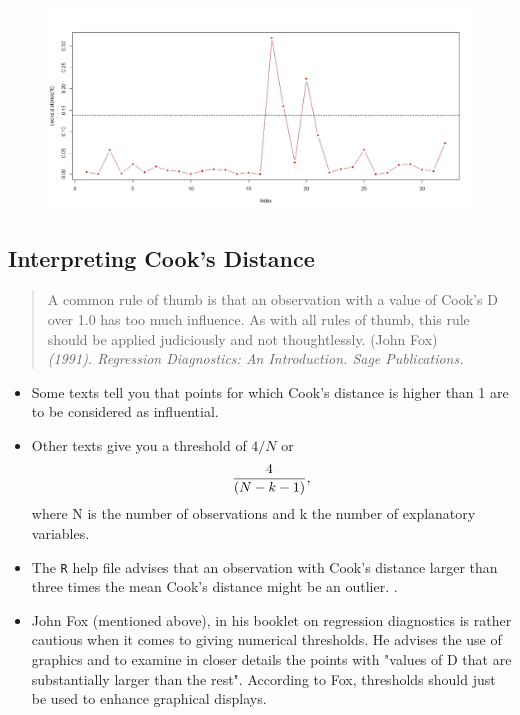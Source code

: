 \documentclass[residuals.tex]{subfiles}
\begin{document}
\begin{figure}[h!]
\centering
\includegraphics[width=0.9\linewidth]{cooksplot}
\caption{}
\label{fig:cooksplot}
\end{figure}


\newpage


\subsection{Interpreting Cook's Distance}
\begin{quote}
A common rule of thumb is that an observation with a value of Cook's D over 1.0 has too much influence. As with all rules of thumb, this rule should be applied judiciously and not thoughtlessly. (John Fox)\\ \textit{(1991). Regression Diagnostics: An Introduction. Sage Publications.}
\end{quote}
\bigskip
\begin{itemize}
\item Some texts tell you that points for which Cook's distance is higher than 1 are to be considered as influential. 
\item Other texts give you a threshold of $4/N$ or \[ {4  \over (N-k-1)} ,\] where N is the number of observations and k the number of explanatory variables. 
\item The \texttt{R} help file advises that an observation with Cook's distance larger than three times the mean Cook's distance might be an outlier. .

\item John Fox (mentioned above), in his booklet on regression diagnostics is rather cautious when it comes to giving numerical thresholds. He advises the use of graphics and to examine in closer details the points with "values of D that are substantially larger than the rest". According to Fox, thresholds should just be used to enhance graphical displays.
\end{itemize}
\end{document}
